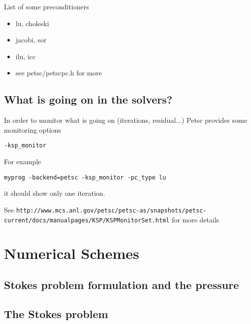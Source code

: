 List of some preconditioners
\begin{itemize}
\item lu, choleski
\item jacobi, sor
\item ilu, icc
\item see petsc/petscpc.h for more
\end{itemize}

\subsection{What is going on in the solvers?}
\label{sec:what-going-solvers}

In order to monitor what is going on (iterations, residual...) Petsc
provides some monitoring options
\begin{verbatim}
-ksp_monitor
\end{verbatim}
For example
\begin{verbatim}
myprog -backend=petsc -ksp_monitor -pc_type lu
\end{verbatim}
it should show only one iteration.

See {\tiny\texttt{http://www.mcs.anl.gov/petsc/petsc-as/snapshots/petsc-current/docs/manualpages/KSP/KSPMonitorSet.html}} for more details

\section{Numerical Schemes}
\label{sec:numerical-schemes}

\subsection{Stokes problem formulation and the pressure}
\label{sec:stok-probl-form}

\subsection{The Stokes problem}
\label{sec:stokes-problem}

